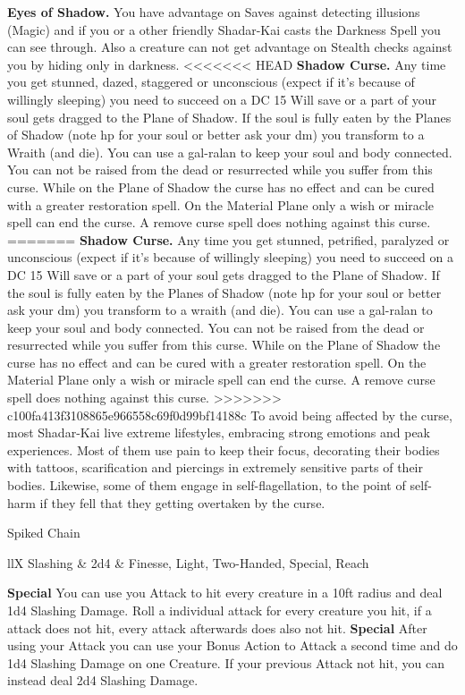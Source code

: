 \documentclass[a4paper,10pt,twoside,twocolumn]{dndbook} %
\begin{document}
	\textbf{Eyes of Shadow.} You have advantage on Saves against detecting illusions (Magic) and if you or a other friendly Shadar-Kai casts the Darkness Spell you can see through. Also a creature can not get advantage on Stealth checks against you by hiding only in darkness.
<<<<<<< HEAD
	\textbf{Shadow Curse.} Any time you get stunned, dazed, staggered or unconscious (expect if it's because of willingly sleeping) you need to succeed on a DC 15 Will save or a part of your soul gets dragged to the Plane of Shadow. If the soul is fully eaten by the Planes of Shadow (note hp for your soul or better ask your dm) you transform to a Wraith (and die). You can use a gal-ralan to keep your soul and body connected. You can not be raised from the dead or resurrected while you suffer from this curse. While on the Plane of Shadow the curse has no effect and can be cured with a greater restoration spell. On the Material Plane only a wish or miracle spell can end the curse. A remove curse spell does nothing against this curse.\linebreak
=======
	\textbf{Shadow Curse.} Any time you get stunned, petrified, paralyzed or unconscious (expect if it's because of willingly sleeping) you need to succeed on a DC 15 Will save or a part of your soul gets dragged to the Plane of Shadow. If the soul is fully eaten by the Planes of Shadow (note hp for your soul or better ask your dm) you transform to a wraith (and die). You can use a gal-ralan to keep your soul and body connected. You can not be raised from the dead or resurrected while you suffer from this curse. While on the Plane of Shadow the curse has no effect and can be cured with a greater restoration spell. On the Material Plane only a wish or miracle spell can end the curse. A remove curse spell does nothing against this curse.\linebreak
>>>>>>> c100fa413f3108865e966558c69f0d99bf14188c
	To avoid being affected by the curse, most Shadar-Kai live extreme lifestyles, embracing strong emotions and peak experiences. Most of them use pain to keep their focus, decorating their bodies with tattoos, scarification and piercings in extremely sensitive parts of their bodies. Likewise, some of them engage in self-flagellation, to the point of self-harm if they fell that they getting overtaken by the curse.
	\begin{DndSidebar}{Spiked Chain}
		\begin{DndTable}{llX}
			Slashing & 2d4 & Finesse, Light, Two-Handed, Special, Reach
		\end{DndTable}
		\textbf{Special} You can use you Attack to hit every creature in a 10ft radius and deal 1d4 Slashing Damage. Roll a individual attack for every creature you hit, if a attack does not hit, every attack afterwards does also not hit.\linebreak
		\textbf{Special} After using your Attack you can use your Bonus Action to Attack a second time and do 1d4 Slashing Damage on one Creature. If your previous Attack not hit, you can instead deal 2d4 Slashing Damage.
	\end{DndSidebar}
	
	
\end{document}
